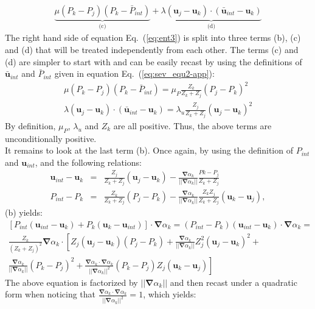 \documentclass[preprint,10pt]{elsarticle}
\newcommand{\grad}{\mbold{\nabla}}
\newcommand{\mbold}[1]{\boldsymbol#1}
\newcommand{\eqt}[1]{Eq.~(\ref{#1})}                     %
\begin{document}
\begin{appendices}
\begin{eqnarray}
\underbrace{\mu (P_k-P_j)(P_k-\bar{P}_{int})}_\textrm{(c)} + \underbrace{\lambda(\mbold u_j-\mbold u_k)\cdot(\bar{\mbold u}_{int}-\mbold u_k)}_\textrm{(d)}
\end{eqnarray}
The right hand side of equation \eqt{eq:ent3} is split into three terms (b), (c) and (d) that will be treated independently from each other. The terms (c) and (d) are simpler to start with and can be easily recast by using the definitions of $\bar{\mbold u}_{int}$ and $\bar{P}_{int}$ given in equation \eqt{eq:sev_equ2-app}:
\begin{eqnarray}
\label{eq:ent4}
\mu (P_k-P_j)(P_k-\bar{P}_{int}) = \mu_P \frac{Z_k}{Z_k+Z_j} (P_j - P_k)^2\nonumber\\
\lambda(\mbold u_j-\mbold u_k)\cdot(\bar{\mbold u}_{int}-\mbold u_k) = \lambda_u \frac{Z_j}{Z_k+Z_j} (\mbold u_j - \mbold u_k)^2 
\end{eqnarray}
By definition, $\mu_P$, $\lambda_u$ and $Z_k$ are all positive. Thus, the above terms are unconditionally positive. \\
It remains to look at the last term (b). Once again, by using the definition of $P_{int}$ and $\mbold u_{int}$, and the following relations:
\begin{eqnarray}
\label{eq:ent4bis}
\mbold u_{int}-\mbold u_k &=& \frac{Z_j}{Z_k+Z_j}(\mbold u_j-\mbold u_k) -  \frac{\grad \alpha_k}{|| \grad \alpha_k ||} \frac{Pk-P_j}{Z_k+Z_j} \nonumber\\
P_{int}-P_k &=& \frac{Z_k}{Z_k+Z_j} (P_j-P_k) - \frac{\grad \alpha_k}{|| \grad \alpha_k ||} \frac{Z_k Z_j}{Z_k+Z_j} (\mbold u_k-\mbold u_j), \nonumber 
\end{eqnarray}
(b) yields:
\begin{eqnarray}
\label{eq:ent5}
\left[ P_{int} (\mbold u_{int}-\mbold u_k) + P_k (\mbold u_k-\mbold u_{int}) \right] \cdot \grad \alpha_k = (P_{int}-P_k)(\mbold u_{int}-\mbold u_k)\cdot \grad \alpha_k=  \nonumber\\ \frac{Z_k}{\left( Z_k+Z_j \right)^2} \grad \alpha_k \cdot \left[ Z_j (\mbold u_j-\mbold u_k)(P_j-P_k)+\frac{\grad \alpha_k}{|| \grad \alpha_k ||} Z_j^2 (\mbold u_j-\mbold u_k)^2 \right. + \nonumber \\ \left. \frac{\grad \alpha_k}{|| \grad \alpha_k ||}(P_k-P_j)^2 +  \frac{\grad \alpha_k \cdot \grad \alpha_k}{|| \grad \alpha_k ||^2}(P_k-P_j)Z_j (\mbold u_k-\mbold u_j) \right] 
\end{eqnarray}
The above equation is factorized by $|| \grad \alpha_k ||$ and then recast under a quadratic form when noticing that $\frac{\grad \alpha_k \cdot \grad \alpha_k}{|| \grad \alpha_k ||^2} = 1$, which yields:

\end{appendices}
\end{document}

